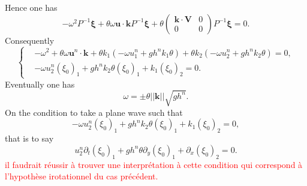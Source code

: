 \documentclass[a4paper, 11pt]{article}
\begin{document}
Hence one has
\begin{equation*}
-\omega^2P^{-1}\boldsymbol{\xi}+\theta\omega \boldsymbol{u}\cdot \boldsymbol{k}P^{-1}\boldsymbol{\xi}+\theta\begin{pmatrix}\boldsymbol{k}\cdot \boldsymbol{V}&0\\0&0\end{pmatrix}P^{-1}\boldsymbol{\xi}=0.
\end{equation*}
Consequently
\begin{equation*}
\left\{\begin{split}
&-\omega^2+\theta\omega \boldsymbol{u}^n\cdot \boldsymbol{k}+\theta k_1(-\omega u_1^n+gh^nk_1\theta)+\theta k_2(-\omega u_2^n+gh^nk_2\theta)=0,\\
&-\omega u_2^n(\xi_0)_1+gh^nk_2\theta(\xi_0)_1+k_1(\xi_0)_2=0.
\end{split}
\right.
\end{equation*}
Eventually one has
\begin{equation*}
\omega=\pm\theta||\boldsymbol{k}||\sqrt{gh^n}.
\end{equation*}
On the condition to take a plane wave such that 
\begin{equation*}
-\omega u_2^n(\xi_0)_1+gh^nk_2\theta(\xi_0)_1+k_1(\xi_0)_2=0,
\end{equation*}
that is to say
\begin{equation*}
u_2^n\partial_t(\xi_0)_1+gh^n\theta\partial_y(\xi_0)_1+\partial_x(\xi_0)_2=0.
\end{equation*}
\textcolor{red}{il faudrait r\'eussir \`a trouver une interpr\'etation \`a cette condition qui correspond \`a l'hypoth\`ese irotationnel du cas pr\'ec\'edent.}\\
\end{document}
